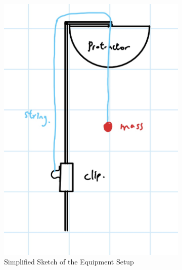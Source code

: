 \documentclass{article}
\begin{document}
\begin{figure}[h!]
    \centering
    \begin{subfigure}[t]{0.3\textwidth}
        \centering
        \includegraphics[width=\linewidth]{setup_sketch.png}
        \caption{Simplified Sketch of the Equipment Setup}
        \label{fig:sketch_setup}
    \end{subfigure}%
    \hfil 
    \begin{subfigure}[t]{0.3\textwidth}
        \centering

\end{subfigure}
\end{figure}
\end{document}
